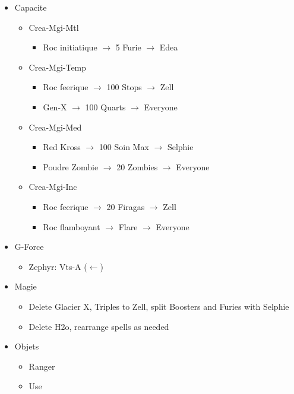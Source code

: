 \begin{menu}
	\begin{itemize}
		\item Capacite
			\begin{itemize}
				\item Crea-Mgi-Mtl
					\begin{itemize}
						\item Roc initiatique $\rightarrow$ 5 Furie $\rightarrow$ Edea
					\end{itemize}
				\item Crea-Mgi-Temp
					\begin{itemize}
						\item Roc feerique $\rightarrow$ 100 Stops $\rightarrow$ Zell
						\item Gen-X $\rightarrow$ 100 Quarts $\rightarrow$ Everyone
					\end{itemize}
				\item Crea-Mgi-Med
					\begin{itemize}
						\item Red Kross $\rightarrow$ 100 Soin Max $\rightarrow$ Selphie
						\item Poudre Zombie $\rightarrow$ 20 Zombies $\rightarrow$ Everyone
					\end{itemize}
				\item Crea-Mgi-Inc
					\begin{itemize}
						\item Roc feerique $\rightarrow$ 20 Firagas $\rightarrow$ Zell
						\item Roc flamboyant $\rightarrow$ Flare $\rightarrow$ Everyone
					\end{itemize}
			\end{itemize}
		\item G-Force
			\begin{itemize}
				\item Zephyr: Vts-A ($\leftarrow$)
			\end{itemize}
		\item Magie
			\begin{itemize}
				\item Delete Glacier X, Triples to Zell, split Boosters and Furies with Selphie
				\item Delete H2o, rearrange spells as needed
			\end{itemize}
		\item Objets
			\begin{itemize}
				\item Ranger
				\item Use

\end{itemize}
\end{itemize}
\end{menu}
